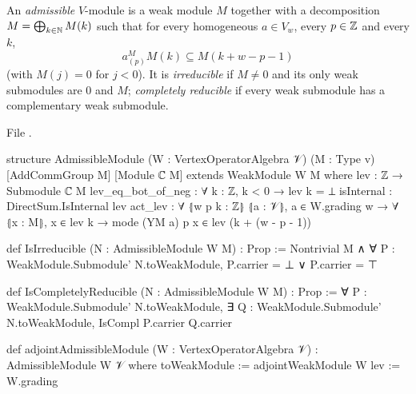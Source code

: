 \begin{definition}\label{l12:def:admissible}
An \emph{admissible} $V$-module is a weak module $M$ together with a decomposition
$M = \bigoplus_{k\in{\mathbb{N}}}M(k)$ such that for every homogeneous $a\in V_w$, every $p\in{\mathbb{Z}}$ and every
$k$,
\begin{equation*}
 a^M_{(p)}M(k)\subseteq M(k + w - p - 1)
\end{equation*}
(with $M(j) = 0$ for $j<0$). It is \emph{irreducible} if $M\neq0$ and its only weak submodules are
$0$ and $M$; \emph{completely reducible} if every weak submodule has a complementary weak submodule.
\end{definition}
\noindent File .
\begin{leancode}
structure AdmissibleModule (W : VertexOperatorAlgebra 𝒱) (M : Type v)
    [AddCommGroup M] [Module ℂ M] extends WeakModule W M where
  lev : ℤ → Submodule ℂ M
  lev_eq_bot_of_neg : ∀ k : ℤ, k < 0 → lev k = ⊥
  isInternal : DirectSum.IsInternal lev
  act_lev : ∀ ⦃w p k : ℤ⦄ ⦃a : 𝒱⦄, a ∈ W.grading w → ∀ ⦃x : M⦄, x ∈ lev k →
    mode (YM a) p x ∈ lev (k + (w - p - 1))

def IsIrreducible (N : AdmissibleModule W M) : Prop :=
  Nontrivial M ∧ ∀ P : WeakModule.Submodule' N.toWeakModule, P.carrier = ⊥ ∨ P.carrier = ⊤

def IsCompletelyReducible (N : AdmissibleModule W M) : Prop :=
  ∀ P : WeakModule.Submodule' N.toWeakModule,
    ∃ Q : WeakModule.Submodule' N.toWeakModule, IsCompl P.carrier Q.carrier

def adjointAdmissibleModule (W : VertexOperatorAlgebra 𝒱) : AdmissibleModule W 𝒱 where
  toWeakModule := adjointWeakModule W
  lev := W.grading
\end{leancode}

